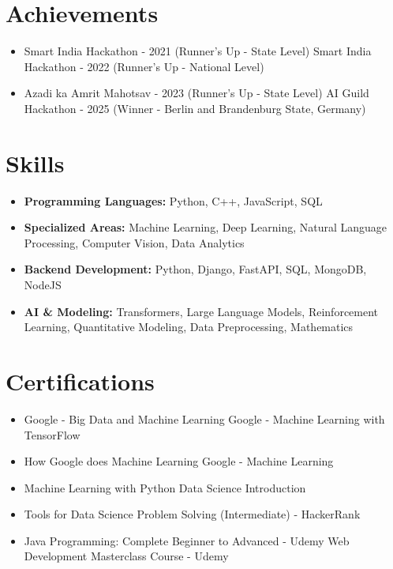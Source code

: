 \documentclass[a4paper,10pt]{article}
\begin{document}
\section*{Achievements}
\begin{itemize}
\item Smart India Hackathon - 2021 (Runner's Up - State Level) \hfill Smart India Hackathon - 2022 (Runner's Up - National Level)
\item Azadi ka Amrit Mahotsav - 2023 (Runner's Up - State Level) \hfill AI Guild Hackathon - 2025 (Winner - Berlin and Brandenburg State, Germany)
\end{itemize}

\section*{Skills}
\begin{itemize}
  \item \textbf{Programming Languages:} Python, C++, JavaScript, SQL
  \item \textbf{Specialized Areas:} Machine Learning, Deep Learning, Natural Language Processing, Computer Vision, Data Analytics
  \item \textbf{Backend Development:} Python, Django, FastAPI, SQL, MongoDB, NodeJS
  \item \textbf{AI \& Modeling:} Transformers, Large Language Models, Reinforcement Learning, Quantitative Modeling, Data Preprocessing, Mathematics
\end{itemize}

\section*{Certifications}
\begin{itemize}
\item Google - Big Data and Machine Learning \hfill Google - Machine Learning with TensorFlow
\item How Google does Machine Learning \hfill Google - Machine Learning
\item Machine Learning with Python \hfill Data Science Introduction
\item Tools for Data Science \hfill Problem Solving (Intermediate) - HackerRank
\item Java Programming: Complete Beginner to Advanced - Udemy \hfill Web Development Masterclass Course - Udemy
\end{itemize}
\end{document}
